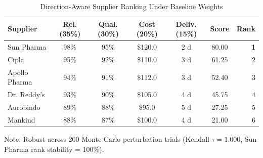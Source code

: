 \begin{table}[htbp]
\centering
\caption{Direction-Aware Supplier Ranking Under Baseline Weights}
\label{tab:supplier_ranking}
\begin{tabular}{lcccccr}
\toprule
\textbf{Supplier} & \textbf{Rel. (35\%)} & \textbf{Qual. (30\%)} & \textbf{Cost (20\%)} & \textbf{Deliv. (15\%)} & \textbf{Score} & \textbf{Rank} \\
\midrule
Sun Pharma & 98\% & 95\% & \$120.0 & 2 d & 80.00 & \textbf{1} \\
Cipla & 95\% & 92\% & \$110.0 & 3 d & 61.25 & 2 \\
Apollo Pharma & 94\% & 91\% & \$112.0 & 3 d & 52.40 & 3 \\
Dr. Reddy's & 93\% & 90\% & \$105.0 & 4 d & 45.75 & 4 \\
Aurobindo & 89\% & 88\% & \$95.0 & 5 d & 27.25 & 5 \\
Mankind & 88\% & 87\% & \$100.0 & 4 d & 21.00 & 6 \\
\bottomrule
\end{tabular}
\begin{flushleft}
\small Note: Robust across 200 Monte Carlo perturbation trials (Kendall $\tau = 1.000$, Sun Pharma rank stability = 100\%).
\end{flushleft}
\end{table}
